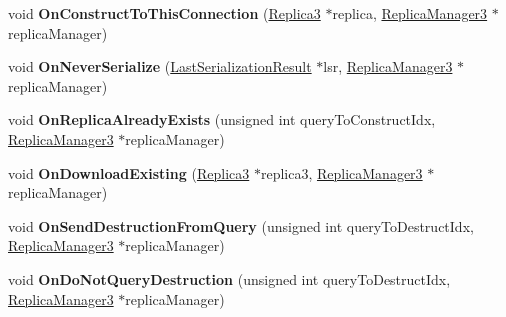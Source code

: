 \begin{DoxyCompactItemize}
\item 
\hypertarget{class_rak_net_1_1_connection___r_m3_ab134374c9365a317afca0e5971a04de8}{void {\bfseries On\-Construct\-To\-This\-Connection} (\hyperlink{class_rak_net_1_1_replica3}{Replica3} $\ast$replica, \hyperlink{class_rak_net_1_1_replica_manager3}{Replica\-Manager3} $\ast$replica\-Manager)}\label{class_rak_net_1_1_connection___r_m3_ab134374c9365a317afca0e5971a04de8}

\item 
\hypertarget{class_rak_net_1_1_connection___r_m3_a2464223d9e66e7481456d35393d13c11}{void {\bfseries On\-Never\-Serialize} (\hyperlink{struct_rak_net_1_1_last_serialization_result}{Last\-Serialization\-Result} $\ast$lsr, \hyperlink{class_rak_net_1_1_replica_manager3}{Replica\-Manager3} $\ast$replica\-Manager)}\label{class_rak_net_1_1_connection___r_m3_a2464223d9e66e7481456d35393d13c11}

\item 
\hypertarget{class_rak_net_1_1_connection___r_m3_acda6259fd75316f6e44e587b5926d3a4}{void {\bfseries On\-Replica\-Already\-Exists} (unsigned int query\-To\-Construct\-Idx, \hyperlink{class_rak_net_1_1_replica_manager3}{Replica\-Manager3} $\ast$replica\-Manager)}\label{class_rak_net_1_1_connection___r_m3_acda6259fd75316f6e44e587b5926d3a4}

\item 
\hypertarget{class_rak_net_1_1_connection___r_m3_a6e2e96c805625cbfa9913376d7985c1b}{void {\bfseries On\-Download\-Existing} (\hyperlink{class_rak_net_1_1_replica3}{Replica3} $\ast$replica3, \hyperlink{class_rak_net_1_1_replica_manager3}{Replica\-Manager3} $\ast$replica\-Manager)}\label{class_rak_net_1_1_connection___r_m3_a6e2e96c805625cbfa9913376d7985c1b}

\item 
\hypertarget{class_rak_net_1_1_connection___r_m3_a72f0f5fca51521c93dd304ece7298695}{void {\bfseries On\-Send\-Destruction\-From\-Query} (unsigned int query\-To\-Destruct\-Idx, \hyperlink{class_rak_net_1_1_replica_manager3}{Replica\-Manager3} $\ast$replica\-Manager)}\label{class_rak_net_1_1_connection___r_m3_a72f0f5fca51521c93dd304ece7298695}

\item 
\hypertarget{class_rak_net_1_1_connection___r_m3_ae106931cddc5bee3accd71edb46a3769}{void {\bfseries On\-Do\-Not\-Query\-Destruction} (unsigned int query\-To\-Destruct\-Idx, \hyperlink{class_rak_net_1_1_replica_manager3}{Replica\-Manager3} $\ast$replica\-Manager)}\label{class_rak_net_1_1_connection___r_m3_ae106931cddc5bee3accd71edb46a3769}


\end{DoxyCompactItemize}
